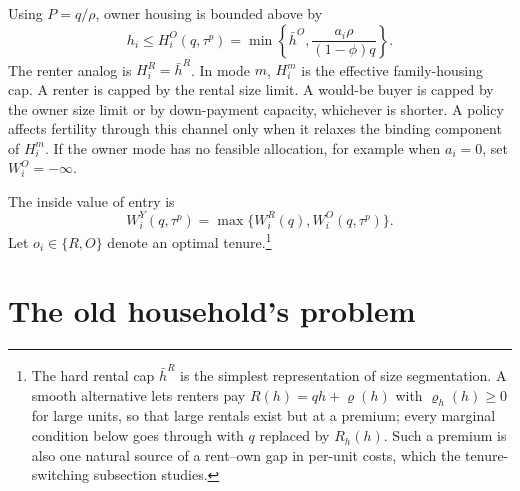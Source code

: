 \documentclass[11pt]{article}
\newcommand{\1}{\mathbf 1}
\begin{document}
Using $P=q/\rho$, owner housing is bounded above by
\[
h_i\le
H_i^O(q,\tau^p)
=
\min\left\{
\bar h^O,
\frac{a_i\rho}{(1-\phi)q}
\right\}.
\]
The renter analog is $H_i^R=\bar h^R$. In mode $m$, $H_i^m$ is the effective family-housing cap. A renter is capped by the rental size limit. A would-be buyer is capped by the owner size limit or by down-payment capacity, whichever is shorter. A policy affects fertility through this channel only when it relaxes the binding component of $H_i^m$. If the owner mode has no feasible allocation, for example when $a_i=0$, set $W_i^O=-\infty$.

The inside value of entry is
\begin{equation}
W_i^Y(q,\tau^p)
=
\max\{W_i^R(q),W_i^O(q,\tau^p)\}.
\label{eq:compact_tenure_value}
\end{equation}
Let $o_i\in\{R,O\}$ denote an optimal tenure.\footnote{The hard rental cap $\bar h^R$ is the simplest representation of size segmentation. A smooth alternative lets renters pay $R(h)=q h+\varrho(h)$ with $\varrho_h(h)\ge0$ for large units, so that large rentals exist but at a premium; every marginal condition below goes through with $q$ replaced by $R_h(h)$. Such a premium is also one natural source of a rent--own gap in per-unit costs, which the tenure-switching subsection studies.}

\section{The old household's problem}
\end{document}
